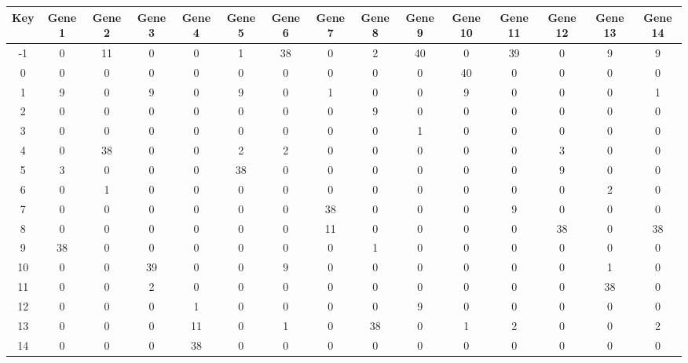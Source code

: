 \begin{tabular}{|c|c|c|c|c|c|c|c|c|c|c|c|c|c|c|}
\hline
Key & Gene 1 & Gene 2 & Gene 3 & Gene 4 & Gene 5 & Gene 6 & Gene 7 & Gene 8 & Gene 9 & Gene 10 & Gene 11 & Gene 12 & Gene 13 & Gene 14 \\
\hline
-1 & 0 & 11 & 0 & 0 & 1 & 38 & 0 & 2 & 40 & 0 & 39 & 0 & 9 & 9 \\
0 & 0 & 0 & 0 & 0 & 0 & 0 & 0 & 0 & 0 & 40 & 0 & 0 & 0 & 0 \\
1 & 9 & 0 & 9 & 0 & 9 & 0 & 1 & 0 & 0 & 9 & 0 & 0 & 0 & 1 \\
2 & 0 & 0 & 0 & 0 & 0 & 0 & 0 & 9 & 0 & 0 & 0 & 0 & 0 & 0 \\
3 & 0 & 0 & 0 & 0 & 0 & 0 & 0 & 0 & 1 & 0 & 0 & 0 & 0 & 0 \\
4 & 0 & 38 & 0 & 0 & 2 & 2 & 0 & 0 & 0 & 0 & 0 & 3 & 0 & 0 \\
5 & 3 & 0 & 0 & 0 & 38 & 0 & 0 & 0 & 0 & 0 & 0 & 9 & 0 & 0 \\
6 & 0 & 1 & 0 & 0 & 0 & 0 & 0 & 0 & 0 & 0 & 0 & 0 & 2 & 0 \\
7 & 0 & 0 & 0 & 0 & 0 & 0 & 38 & 0 & 0 & 0 & 9 & 0 & 0 & 0 \\
8 & 0 & 0 & 0 & 0 & 0 & 0 & 11 & 0 & 0 & 0 & 0 & 38 & 0 & 38 \\
9 & 38 & 0 & 0 & 0 & 0 & 0 & 0 & 1 & 0 & 0 & 0 & 0 & 0 & 0 \\
10 & 0 & 0 & 39 & 0 & 0 & 9 & 0 & 0 & 0 & 0 & 0 & 0 & 1 & 0 \\
11 & 0 & 0 & 2 & 0 & 0 & 0 & 0 & 0 & 0 & 0 & 0 & 0 & 38 & 0 \\
12 & 0 & 0 & 0 & 1 & 0 & 0 & 0 & 0 & 9 & 0 & 0 & 0 & 0 & 0 \\
13 & 0 & 0 & 0 & 11 & 0 & 1 & 0 & 38 & 0 & 1 & 2 & 0 & 0 & 2 \\
14 & 0 & 0 & 0 & 38 & 0 & 0 & 0 & 0 & 0 & 0 & 0 & 0 & 0 & 0 \\
\hline
\end{tabular}